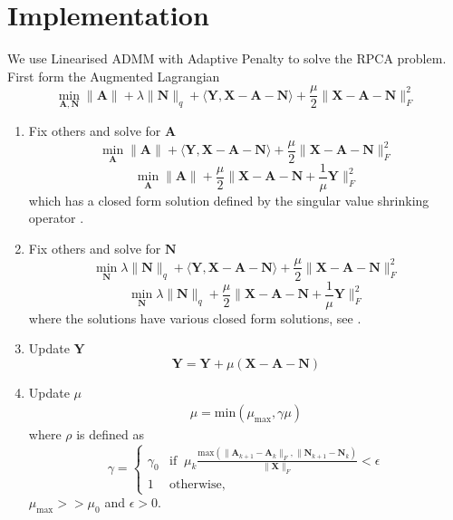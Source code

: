 \documentclass{article}
\begin{document}
\section{Implementation}

We use Linearised ADMM with Adaptive Penalty \cite{lin2011linearized} to solve the RPCA problem. First form the Augmented Lagrangian
\[
\min_{\mathbf{A, N}} \|\mathbf A \| + \lambda\|\mathbf N\|_{q} + \langle \mathbf{Y, X - A - N} \rangle + \frac{\mu}{2} \| \mathbf{X - A - N}  \|_F^2
\]

\begin{enumerate}
\item Fix others and solve for $\mathbf A$
\[
\min_{\mathbf{A}} \|\mathbf A \| + \langle \mathbf{Y, X - A - N} \rangle + \frac{\mu}{2} \| \mathbf{X - A - N}  \|_F^2
\]
\[
\min_{\mathbf{A}} \|\mathbf A \| + \frac{\mu}{2} \| \mathbf{X - A - N} + \frac{1}{\mu}\mathbf Y  \|_F^2
\]
which has a closed form solution defined by the singular value shrinking operator \cite{lin2011linearized,candes2011robust}.

\item Fix others and solve for $\mathbf N$
\[
\min_{\mathbf{N}} \lambda\|\mathbf N\|_{q} + \langle \mathbf{Y, X - A - N} \rangle + \frac{\mu}{2} \| \mathbf{X - A - N}  \|_F^2
\]
\[
\min_{\mathbf{N}} \lambda\|\mathbf N\|_{q} + \frac{\mu}{2} \| \mathbf{X - A - N} + \frac{1}{\mu}\mathbf Y \|_F^2
\]
where the solutions have various closed form solutions, see \cite{candes2011robust, liu2010robust}.

\item Update $\mathbf Y$
\[
\mathbf Y = \mathbf Y + \mu( \mathbf{X - A - N} )
\]

\item Update $\mu$
\begin{align*}
 \mu = \textrm{min}( \mu_{\text{max}}, \gamma \mu)
\end{align*}
where $\rho$ is defined as
\[
\gamma = 
\begin{cases}
\gamma_0 & \text{if} \;\; \mu_k \frac{\textrm{max} ( \| \mathbf A_{k+1} - \mathbf A_{k}  \|_F  , \|  \mathbf N_{k+1} - \mathbf N_{k})}{\| \mathbf X \|_F} < \epsilon \\
1 & \text{otherwise,}
\end{cases}
\]
$\mu_{\text{max}} >>  \mu_0$ and $\epsilon > 0$.
\end{enumerate}



\end{document}
